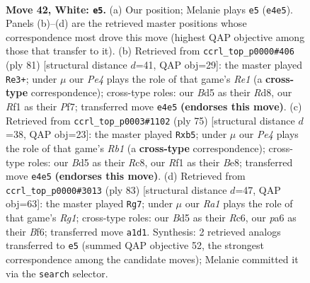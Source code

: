 \documentclass[11pt]{article}
\begin{document}
\clearpage

\begin{figure}[p]\centering
\begin{subfigure}{0.46\textwidth}\centering
\resizebox{\linewidth}{!}{%
\newchessgame
\chessboard[
  setfen={r7/1p3p2/p5k1/3B3p/bP2P1r1/P6K/8/R4R2 w - - 0 42},
  showmover=false,
  pgfstyle=straightmove, color=movearrow, markmove={e4-e5}
]}
\caption{}
\end{subfigure}\hfill
\begin{subfigure}{0.46\textwidth}\centering
\resizebox{\linewidth}{!}{%
\newchessgame
\chessboard[
  setfen={3rr3/5pk1/R2P4/2pR4/2Pb3p/3K2P1/2B4P/8 b - - 1 41},
  showmover=false,
  pgfstyle=straightmove, color=movearrow, markmove={e8-e3}
]}
\caption{}
\end{subfigure}
\\[4pt]
\begin{subfigure}{0.46\textwidth}\centering
\resizebox{\linewidth}{!}{%
\newchessgame
\chessboard[
  setfen={1rr1b2k/5pp1/2P4p/1P6/2R4P/4R3/3N2P1/6K1 b - - 0 38},
  showmover=false,
  pgfstyle=straightmove, color=movearrow, markmove={b8-b5}
]}
\caption{}
\end{subfigure}\hfill
\begin{subfigure}{0.46\textwidth}\centering
\resizebox{\linewidth}{!}{%
\newchessgame
\chessboard[
  setfen={6r1/3R4/p1r1kbp1/1p1R4/8/P1P5/KPB5/8 b - - 0 42},
  showmover=false,
  pgfstyle=straightmove, color=movearrow, markmove={g8-g7}
]}
\caption{}
\end{subfigure}
\caption{\textbf{Move 42, White: \texttt{e5}.} (a) Our position; Melanie plays \texttt{e5} (\texttt{e4e5}). Panels (b)--(d) are the retrieved master positions whose correspondence most drove this move (highest QAP objective among those that transfer to it). (b) Retrieved from \texttt{ccrl\_top\_p0000\#406} (ply 81) [structural distance $d$=41, QAP obj=29]: the master played \texttt{Re3+}; under $\mu$ our \emph{Pe4} plays the role of that game's \emph{Re1} (a \textbf{cross-type} correspondence); cross-type roles: our \emph{B}d5 as their \emph{R}d8, our \emph{R}f1 as their \emph{P}f7; transferred move \texttt{e4e5} \textbf{(endorses this move)}. (c) Retrieved from \texttt{ccrl\_top\_p0003\#1102} (ply 75) [structural distance $d$=38, QAP obj=23]: the master played \texttt{Rxb5}; under $\mu$ our \emph{Pe4} plays the role of that game's \emph{Rb1} (a \textbf{cross-type} correspondence); cross-type roles: our \emph{B}d5 as their \emph{R}c8, our \emph{R}f1 as their \emph{B}e8; transferred move \texttt{e4e5} \textbf{(endorses this move)}. (d) Retrieved from \texttt{ccrl\_top\_p0000\#3013} (ply 83) [structural distance $d$=47, QAP obj=63]: the master played \texttt{Rg7}; under $\mu$ our \emph{Ra1} plays the role of that game's \emph{Rg1}; cross-type roles: our \emph{B}d5 as their \emph{R}c6, our \emph{p}a6 as their \emph{B}f6; transferred move \texttt{a1d1}. Synthesis: 2 retrieved analogs transferred to \texttt{e5} (summed QAP objective 52, the strongest correspondence among the candidate moves); Melanie committed it via the \texttt{search} selector.}
\label{fig:thought-m82}
\end{figure}
\end{document}
